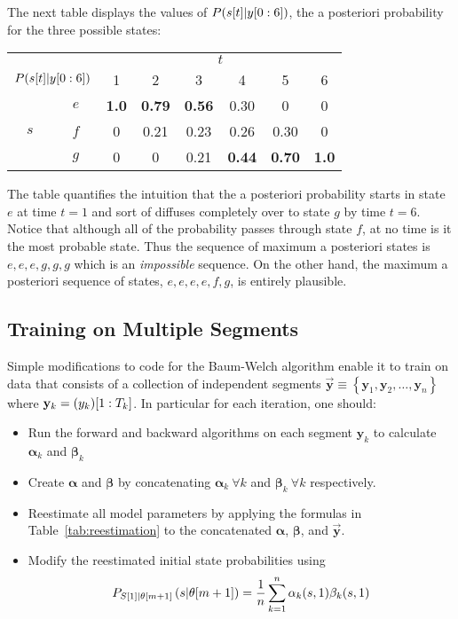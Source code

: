 The next table displays the values of $P({s}{[t]}|y[0:6])$, the
a posteriori probability for the three possible states:
\begin{center}
  \begin{tabular}{cc|cccccc}
    &   & \multicolumn{6}{c}{$t$} \\
    \multicolumn{2}{r|}{$P({s}{[t]}|y[0:6])$}
        & 1 & 2 & 3 & 4 & 5 & 6 \\
    \hline
    & $e$ & \textbf{1.0} & \textbf{0.79} & \textbf{0.56} & 0.30 & 0    & 0  \\
$s$ & $f$ & 0   & 0.21 & 0.23 & 0.26 & 0.30 & 0   \\
    & $g$ & 0   & 0    & 0.21 & \textbf{0.44} & \textbf{0.70} & \textbf{1.0}
  \end{tabular}
\end{center}
The table quantifies the intuition that the a posteriori probability starts
in state $e$ at time $t=1$ and sort of diffuses completely over to
state $g$ by time $t=6$.  Notice that although all of the probability
passes through state $f$, at no time is it the most probable state.
Thus the sequence of maximum a posteriori states is $e,e,e,g,g,g$ which is
an \emph{impossible} sequence.  On the other hand, the maximum a posteriori
sequence of states, $e,e,e,e,f,g$, is entirely plausible.

\subsection{Training on Multiple Segments}
\label{sec:MultiSegment}


Simple modifications to code for the Baum-Welch algorithm enable it to
train on data that consists of a collection of independent segments
$\mathbf{\vec y} \equiv \left\{ \mathbf{y}_1, \mathbf{y}_2, \ldots,
  \mathbf{y}_n \right\}$ where $ \mathbf{y}_k = (y_k)[1:T_k]$.
In particular for each iteration, one should:
\begin{itemize}
\item Run the forward and backward algorithms on each segment
  $\mathbf{y}_k$ to calculate ${\bm \alpha}_k$ and
  ${\bm \beta}_k$
\item Create ${\bm \alpha}$ and ${\bm \beta}$ by concatenating
  ${\bm \alpha}_k~\forall k$ and ${\bm \beta}_k~\forall k$
  respectively.
\item Reestimate all model parameters by applying the formulas in
  Table~\ref{tab:reestimation} to the concatenated  ${\bm \alpha}$,
  ${\bm \beta}$, and $\mathbf{\vec y}$.
\item Modify the reestimated initial state probabilities using
  \begin{equation*}
    P_{{S}{[1]}|{\theta}{[m+1]}} \left(s|{\theta}{[m+1]}
    \right) = \frac{1}{n} \sum_{k=1}^n \alpha_k(s,1) \beta_k(s,1)
  \end{equation*}
\end{itemize}

